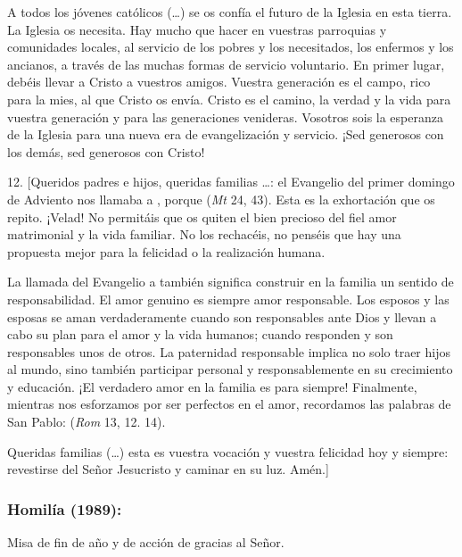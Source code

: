 \begin{body}
\begin{body}
		A todos los jóvenes católicos (\ldots{}) se os confía el futuro de la Iglesia en esta tierra. La Iglesia os necesita. Hay mucho que hacer en vuestras parroquias y comunidades locales, al servicio de los pobres y los necesitados, los enfermos y los ancianos, a través de las muchas formas de servicio voluntario. En primer lugar, debéis llevar a Cristo a vuestros amigos. Vuestra generación es el campo, rico para la mies, al que Cristo os envía. Cristo es el camino, la verdad y la vida para vuestra generación y para las generaciones venideras. Vosotros sois la esperanza de la Iglesia para una nueva era de evangelización y servicio. ¡Sed generosos con los demás, sed generosos con Cristo!

		12. {[}Queridos padres e hijos, queridas familias \ldots{}: el Evangelio del primer domingo de Adviento nos llamaba a , porque  (\emph{Mt} 24, 43). Esta es la exhortación que os repito. ¡Velad! No permitáis que os quiten el bien precioso del fiel amor matrimonial y la vida familiar. No los rechacéis, no penséis que hay una propuesta mejor para la felicidad o la realización humana.

		La llamada del Evangelio a  también significa construir en la familia un sentido de responsabilidad. El amor genuino es siempre amor responsable. Los esposos y las esposas se aman verdaderamente cuando son responsables ante Dios y llevan a cabo su plan para el amor y la vida humanos; cuando responden y son responsables unos de otros. La paternidad responsable implica no solo traer hijos al mundo, sino también participar personal y responsablemente en su crecimiento y educación. ¡El verdadero amor en la familia es para siempre! Finalmente, mientras nos esforzamos por ser perfectos en el amor, recordamos las palabras de San Pablo:  (\emph{Rom} 13, 12. 14).

		Queridas familias (\ldots{}) esta es vuestra vocación y vuestra felicidad hoy y siempre: revestirse del Señor Jesucristo y caminar en su luz. Amén.{]}
	\end{body}

	\subsubsection{Homilía (1989):} Misa de fin de año y  de acción de gracias al Señor.


\end{body}
